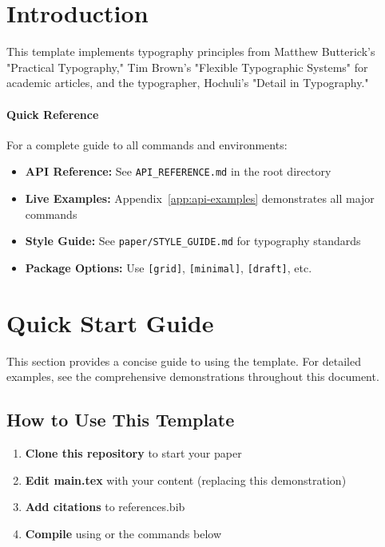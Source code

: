 \documentclass[11pt]{article}
\begin{document}



\section{Introduction}
\label{sec:introduction}

This template implements typography principles from Matthew Butterick's "Practical Typography," Tim Brown's "Flexible Typographic Systems" for academic articles, and the typographer, Hochuli's "Detail in Typography."

\paragraph{Quick Reference} For a complete guide to all commands and environments:
\begin{itemize}
  \item \textbf{API Reference:} See \texttt{API\_REFERENCE.md} in the root directory
  \item \textbf{Live Examples:} Appendix~\ref{app:api-examples} demonstrates all major commands
  \item \textbf{Style Guide:} See \texttt{paper/STYLE\_GUIDE.md} for typography standards
  \item \textbf{Package Options:} Use \texttt{[grid]}, \texttt{[minimal]}, \texttt{[draft]}, etc.
\end{itemize}

\section{Quick Start Guide}
\label{sec:quickstart}

This section provides a concise guide to using the template. For detailed examples, see the comprehensive demonstrations throughout this document.

\subsection{How to Use This Template}

\begin{enumerate}
\item \textbf{Clone this repository} to start your paper
\item \textbf{Edit main.tex} with your content (replacing this demonstration)
\item \textbf{Add citations} to references.bib
\item \textbf{Compile} using  or the commands below
\end{enumerate}
\end{document}
